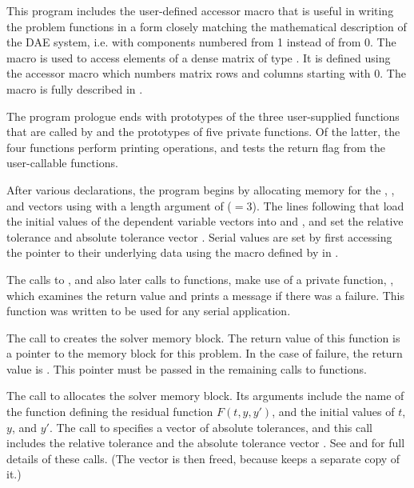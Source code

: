 This program includes the user-defined accessor macro
 that is useful in writing the problem functions in a form
closely matching the mathematical description of the DAE system,
i.e. with components numbered from 1 instead of from 0.
The  macro is used to access elements of a dense matrix of
type . It is defined using the accessor macro
 which numbers matrix rows and columns starting with
0. The macro  is fully described in .

The program prologue ends with prototypes of the three user-supplied functions 
that are called by {\ida} and the prototypes of five private functions.
Of the latter, the four  functions perform printing
operations, and   tests the return flag from the {\ida}
user-callable functions.

After various declarations, the  program begins by
allocating memory for the , , and  vectors using
 with a length argument of  ($= 3$). The
lines following that load the initial values of the dependent
variable vectors into  and , and set the relative tolerance 
 and absolute tolerance vector . Serial  
values are set by first accessing the pointer to their underlying data using
the macro  defined by {\nvecs} in .

The calls to , and also later calls to 
functions, make use of a private function, , which examines
the return value and prints a message if there was a failure.  This
 function was written to be used for any serial {\sundials}
application.

The call to  creates the {\ida} solver memory block.
The return value of this function is a pointer to the memory block for this
problem.  In the case of failure, the return value is .  This
pointer must be passed in the remaining calls to {\ida} functions.

The call to  allocates the solver memory block.
Its arguments include the name of the {\CC} function  defining the
residual function $F(t,y,y')$, and the initial values of $t$, $y$, and $y'$.
The call to  specifies a vector of absolute tolerances, and
this call includes the relative tolerance  and the absolute tolerance
vector .  See  and 
for full details of these calls.  (The  vector is then freed,
because {\ida} keeps a separate copy of it.)

